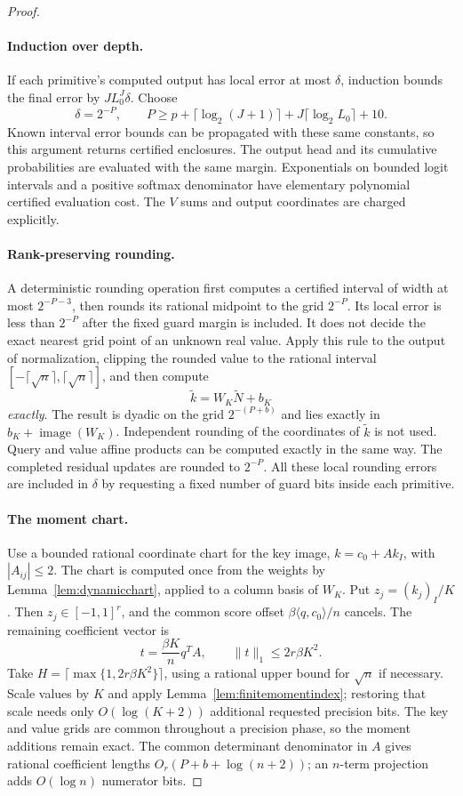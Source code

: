\begin{proof}
\paragraph{Induction over depth.}
If each primitive's computed output has local error at most
$\delta$, induction bounds the final error by
$J L_0^J\delta$.  Choose
\[
 \delta=2^{-P},\qquad
 P\ge p+\lceil\log_2(J+1)\rceil
       +J\lceil\log_2L_0\rceil+10.
\]
Known interval error bounds can be propagated with these same
constants, so this argument returns certified enclosures.  The
output head and its
cumulative probabilities are evaluated with the same margin.
Exponentials on bounded logit intervals and a positive softmax
denominator have elementary polynomial certified evaluation cost.
The $V$ sums and output coordinates are charged explicitly.

\paragraph{Rank-preserving rounding.}
A deterministic rounding operation first computes a certified
interval of width at most $2^{-P-3}$, then rounds its rational midpoint to the grid
$2^{-P}$.  Its local error is less than $2^{-P}$ after the fixed
guard margin is included.  It does not decide the exact nearest
grid point of an unknown real value.  Apply this rule to the output
of normalization, clipping the rounded value to the
rational interval $[-\lceil\sqrt n\rceil,\lceil\sqrt n\rceil]$,
and then compute
\[
 \widetilde k=W_K\widetilde N+b_K
\]
\emph{exactly}.  The result is dyadic on the grid $2^{-(P+b)}$
and lies exactly in $b_K+\operatorname{image}(W_K)$.  Independent
rounding of the coordinates of $\widetilde k$ is not used.  Query
and value affine products can be computed exactly in the same
way.  The completed residual updates are rounded to $2^{-P}$.
All these local rounding errors are included in $\delta$ by
requesting a fixed number of guard bits inside each primitive.

\paragraph{The moment chart.}
Use a bounded rational coordinate chart for the key image,
$k=c_0+A k_I$, with $|A_{ij}|\le2$.  The chart is computed once
from the weights by Lemma~\ref{lem:dynamicchart}, applied to a
column basis of $W_K$.  Put
$z_j=(k_j)_I/K$.  Then $z_j\in[-1,1]^r$, and the common score
offset $\beta\langle q,c_0\rangle/n$ cancels.  The remaining
coefficient vector is
\[
 t=\frac{\beta K}{n}q^T A,\qquad
 \|t\|_1\le2r\beta K^2.
\]
Take $H=\lceil\max\{1,2r\beta K^2\}\rceil$, using a rational
upper bound for $\sqrt n$ if necessary.  Scale values by $K$ and
apply Lemma~\ref{lem:finitemomentindex}; restoring that scale
needs only $O(\log(K+2))$ additional requested precision bits.
The key and value grids are common throughout a precision phase,
so the moment additions remain exact.  The common determinant
denominator in $A$ gives rational coefficient lengths
$O_r(P+b+\log(n+2))$; an $n$-term projection adds $O(\log n)$
numerator bits.


\end{proof}
